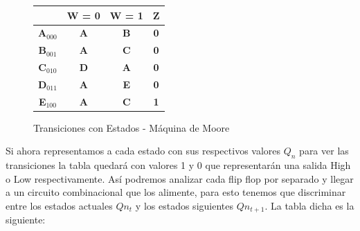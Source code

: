 \documentclass[10pt,a4paper]{article}
\begin{document}
\begin{figure}[H]
	\begin{center}
		\begin{tabular}{c|c|c|c|}
		\cline{2-4}
		\textbf{} & \textbf{W = 0} & \textbf{W = 1} & \textbf{Z} \\ \hline
		\multicolumn{1}{|c|}{\textbf{A$_{000}$}} & \textbf{A} & \textbf{B} & \textbf{0} \\ \hline
		\multicolumn{1}{|c|}{\textbf{B$_{001}$}} & \textbf{A} & \textbf{C} & \textbf{0} \\ \hline
		\multicolumn{1}{|c|}{\textbf{C$_{010}$}} & \textbf{D} & \textbf{A} & \textbf{0} \\ \hline
		\multicolumn{1}{|c|}{\textbf{D$_{011}$}} & \textbf{A} & \textbf{E} & \textbf{0} \\ \hline
		\multicolumn{1}{|c|}{\textbf{E$_{100}$}} & \textbf{A} & \textbf{C} & \textbf{1} \\ \hline
		\end{tabular}
	\caption{Transiciones con Estados - Máquina de Moore} 
	\label{2_fig1}
	\end{center}
\end{figure}
Si ahora representamos a cada estado con sus respectivos valores $Q_n$ para ver las transiciones la tabla quedar\'a con valores 1 y 0 que representar\'an una salida High o Low respectivamente. As\'i podremos analizar cada flip flop por separado y llegar a un circuito combinacional que los alimente, para esto tenemos que discriminar entre los estados actuales $Q{n_{t}}$ y los estados siguientes $Q{n_{t+1}}$. La tabla dicha es la siguiente:
\end{document}
